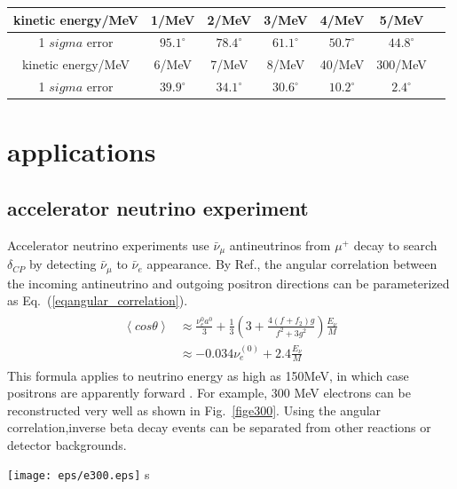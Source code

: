 \documentclass[a4paper,10pt]{cpc-hepnp}
\begin{document}
\begin{center}
\footnotesize
\begin{tabular*}{190mm}{@{\extracolsep{\fill}}ccccccc}
\toprule kinetic energy/MeV & 1/MeV  & 2/MeV &  3/MeV & 4/MeV &  5/MeV \\
\hline
1 $sigma$ error\hphantom{00} & $95.1^{\circ}$&$78.4^{\circ}$ &$61.1^{\circ}$ &$50.7^{\circ}$&$44.8^{\circ}$\\
\toprule kinetic energy/MeV & 6/MeV & 7/MeV & 8/MeV & 40/MeV & 300/MeV\\
\hline
1 $sigma$ error\hphantom{00} & $39.9^{\circ}$ &$34.1^{\circ}$&$30.6^{\circ}$&$10.2^{\circ}$&$2.4^{\circ}$\\
\bottomrule
\end{tabular*}%
\end{center}






\section{applications}
\subsection{accelerator neutrino experiment}

Accelerator neutrino experiments use $\bar{\nu}_{\mu}$ antineutrinos from $\mu^{+}$ decay  to search $\delta_{CP}$ by detecting
$\bar{\nu}_{\mu}$  to $\bar{\nu}_{e}$  appearance.
By Ref.\cite{angular_corrrelation}, the angular correlation between the incoming antineutrino and
outgoing positron directions can be parameterized  as Eq.~(\ref{eqangular_correlation}).
\begin{eqnarray}
\label{eqangular_correlation}
\begin{aligned}
\left<cos\theta\right>&\approx \frac{\nu^{0}_{e}a^{0}}{3}+\frac{1}{3}\left(3+\frac{4(f+f_{2})g}{f^{2}+3g^{2}}\right)\frac{E_{\nu}}{M}\\
&\approx -0.034\nu^{(0)}_{e} + 2.4\frac{E_{\nu}}{M}
\end{aligned}
\end{eqnarray}
This formula applies to neutrino energy as high as 150MeV, in which case positrons are apparently forward .
For example, 300 MeV electrons can be reconstructed very well as shown in Fig.~\ref{fige300}. Using the
angular correlation,inverse beta decay events can be separated from other reactions or detector backgrounds.
\begin{center}
\texttt{[image: eps/e300.eps]}
s
\end{center}
\end{document}
